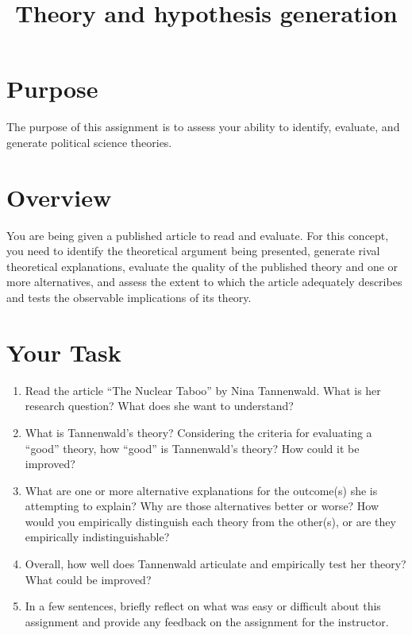 \documentclass[a4, 12pt]{article}
\title{Theory and hypothesis generation}
\author{}
\date{}
\begin{document}
\maketitle

\maketitle
\vspace{-6em}

\section{Purpose}
The purpose of this assignment is to assess your ability to identify, evaluate, and generate political science theories.

\section{Overview}

You are being given a published article to read and evaluate. For this concept, you need to identify the theoretical argument being presented, generate rival theoretical explanations, evaluate the quality of the published theory and one or more alternatives, and assess the extent to which the article adequately describes and tests the observable implications of its theory.

\section{Your Task}

\begin{enumerate}\itemsep1em
\item Read the article ``The Nuclear Taboo'' by Nina Tannenwald. What is her research question? What does she want to understand?

\item What is Tannenwald's theory? Considering the criteria for evaluating a ``good'' theory, how ``good'' is Tannenwald's theory? How could it be improved?

\item What are one or more alternative explanations for the outcome(s) she is attempting to explain? Why are those alternatives better or worse? How would you empirically distinguish each theory from the other(s), or are they empirically indistinguishable?

\item Overall, how well does Tannenwald articulate and empirically test her theory? What could be improved?

\item In a few sentences, briefly reflect on what was easy or difficult about this assignment and provide any feedback on the assignment for the instructor.

\end{enumerate}
\end{document}
